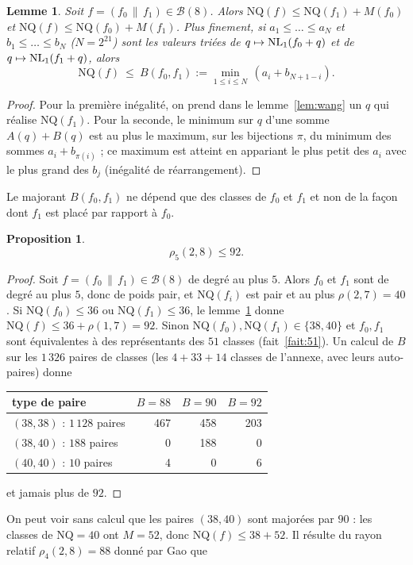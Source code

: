 \documentclass[11pt,a4paper]{article}
\newcommand{\NQ}{\mathrm{NQ}}
\def\NL(#1,#2){ {\rm NL}_{#1}(#2) }
\def\boole(#1){\mathcal{B}(#1)}
\theoremstyle{plain}
\newtheorem{proposition}[theorem]{Proposition}
\newtheorem{lemma}[theorem]{Lemme}
\theoremstyle{definition}
\theoremstyle{remark}
\begin{document}
\begin{lemma}\label{lem:majoration}
Soit $f=(f_0\,\|\,f_1)\in\boole(8)$. Alors $\NQ(f)\le\NQ(f_1)+M(f_0)$ et
$\NQ(f)\le\NQ(f_0)+M(f_1)$. Plus finement, si $a_1\le\dots\le a_N$ et
$b_1\le\dots\le b_N$ ($N=2^{21}$) sont les valeurs triées de $q\mapsto\NL(1,f_0+q)$
et de $q\mapsto\NL(1,f_1+q)$, alors
$$
\NQ(f)\ \le\ B(f_0,f_1):=\min_{1\le i\le N}\,(a_i+b_{N+1-i}).
$$
\end{lemma}
\begin{proof}
Pour la première inégalité, on prend dans le lemme~\ref{lem:wang} un $q$ qui
réalise $\NQ(f_1)$. Pour la seconde, le minimum sur $q$ d'une somme $A(q)+B(q)$ est au
plus le maximum, sur les bijections $\pi$, du minimum des sommes $a_i+b_{\pi(i)}$ ; ce maximum
est atteint en appariant le plus petit des $a_i$ avec le plus grand des $b_j$
(inégalité de réarrangement).
\end{proof}
Le majorant $B(f_0,f_1)$ ne dépend que des classes de $f_0$ et $f_1$ et non de la façon
dont $f_1$ est placé par rapport à $f_0$.

\begin{proposition}\label{prop:rho5}
			$$\rho_5(2,8)\le 92.$$
\end{proposition}
\begin{proof}
Soit $f=(f_0\,\|\,f_1)\in\boole(8)$ de degré au plus $5$. Alors $f_0$ et $f_1$ sont de
degré au plus $5$, donc de poids pair, et $\NQ(f_i)$ est pair et au plus
$\rho(2,7)=40$. Si $\NQ(f_0)\le 36$ ou $\NQ(f_1)\le 36$, le lemme~\ref{lem:majoration}
donne $\NQ(f)\le 36+\rho(1,7)=92$. Sinon $\NQ(f_0),\NQ(f_1)\in\{38,40\}$ et $f_0,f_1$
sont équivalentes à des représentants des $51$ classes (fait~\ref{fait:51}). Un calcul
de $B$ sur les $1\,326$ paires de classes (les $4+33+14$ classes de l'annexe, avec leurs
auto-paires) donne
\begin{center}
\begin{tabular}{l r r r}
\toprule
type de paire & $B=88$ & $B=90$ & $B=92$\\
\midrule
$(38,38)$ : $1\,128$ paires & 467 & 458 & 203\\
$(38,40)$ : $188$ paires & 0 & 188 & 0\\
$(40,40)$ : $10$ paires & 4 & 0 & 6\\
\bottomrule
\end{tabular}
\end{center}
et jamais plus de $92$.
\end{proof}

On peut voir sans calcul que les paires $(38,40)$ sont majorées par $90$ : les
classes de $\NQ=40$ ont $M=52$, donc $\NQ(f)\le 38+52$. Il résulte du 
rayon relatif $\rho_4(2,8) = 88$ donné par Gao que 
\end{document}
